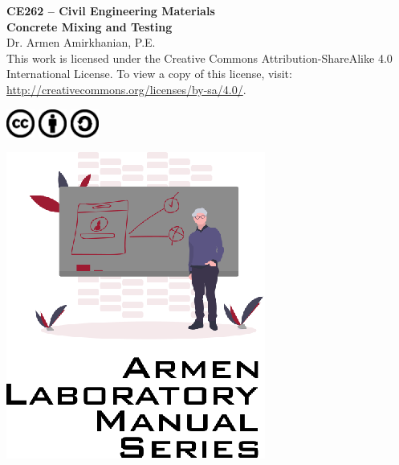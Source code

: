 \documentclass[12pt]{article}
\newcommand{\CourseNum}{CE262}
\newcommand{\CourseName}{Civil Engineering Materials}
\newcommand{\LabTitle}{Concrete Mixing and Testing}
\begin{document}
\begin{titlepage}
\begin{flushright}
\LARGE{\textbf{\CourseNum{} -- \CourseName}}\\
\vfill
\Huge{\textbf{\LabTitle}}\\
    \vfill
    \large Dr. Armen Amirkhanian, P.E.\\
\vfill
\normalsize This work is licensed under the Creative Commons Attribution-ShareAlike 4.0 International License. To view a copy of this license, visit:
\href{http://creativecommons.org/licenses/by-sa/4.0/}{http://creativecommons.org/licenses/by-sa/4.0/}.

\includegraphics[width=0.07\textwidth]{cc.eps}
\includegraphics[width=0.07\textwidth]{by.eps}
\includegraphics[width=0.07\textwidth]{sa.eps}
\vfill

\includegraphics[width=0.3\linewidth]{Logo.eps}\\ 
 
  
\end{flushright}
\end{titlepage}
\end{document}
